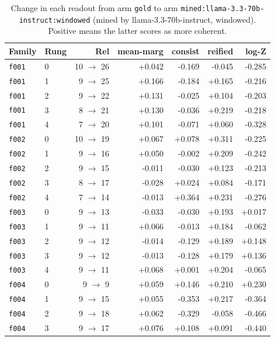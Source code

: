 \documentclass[11pt]{article}
\begin{document}
\begin{table}[htbp]
\centering
\small
\caption{Change in each readout from arm \texttt{gold} to arm \texttt{mined:llama-3.3-70b-instruct:windowed} (mined by llama-3.3-70b-instruct, windowed). Positive means the latter scores as more coherent.}
\label{tab:arm-delta-gold-mined-llama-3-3-70b-instruct-windowed}
\begin{tabular}{llrrrrr}
\toprule
Family & Rung & Rel & \textbf{mean-marg} & \textbf{consist} & \textbf{reified} & \textbf{log-Z} \\
\midrule
\texttt{f001} & 0 & 10 $\to$ 26 & +0.042 & -0.169 & -0.045 & -0.285 \\
\texttt{f001} & 1 & 9 $\to$ 25 & +0.166 & -0.184 & +0.165 & -0.216 \\
\texttt{f001} & 2 & 9 $\to$ 22 & +0.131 & -0.025 & +0.104 & -0.203 \\
\texttt{f001} & 3 & 8 $\to$ 21 & +0.130 & -0.036 & +0.219 & -0.218 \\
\texttt{f001} & 4 & 7 $\to$ 20 & +0.101 & -0.071 & +0.060 & -0.328 \\
\texttt{f002} & 0 & 10 $\to$ 19 & +0.067 & +0.078 & +0.311 & -0.225 \\
\texttt{f002} & 1 & 9 $\to$ 16 & +0.050 & -0.002 & +0.209 & -0.242 \\
\texttt{f002} & 2 & 9 $\to$ 15 & -0.011 & -0.030 & +0.123 & -0.213 \\
\texttt{f002} & 3 & 8 $\to$ 17 & -0.028 & +0.024 & +0.084 & -0.171 \\
\texttt{f002} & 4 & 7 $\to$ 14 & -0.013 & +0.364 & +0.231 & -0.276 \\
\texttt{f003} & 0 & 9 $\to$ 13 & -0.033 & -0.030 & +0.193 & +0.017 \\
\texttt{f003} & 1 & 9 $\to$ 11 & +0.066 & -0.013 & +0.184 & -0.062 \\
\texttt{f003} & 2 & 9 $\to$ 12 & -0.014 & -0.129 & +0.189 & +0.148 \\
\texttt{f003} & 3 & 9 $\to$ 12 & -0.013 & -0.128 & +0.179 & +0.136 \\
\texttt{f003} & 4 & 9 $\to$ 11 & +0.068 & +0.001 & +0.204 & -0.065 \\
\texttt{f004} & 0 & 9 $\to$ 9 & +0.059 & +0.146 & +0.210 & +0.230 \\
\texttt{f004} & 1 & 9 $\to$ 15 & +0.055 & -0.353 & +0.217 & -0.364 \\
\texttt{f004} & 2 & 9 $\to$ 18 & +0.062 & -0.329 & -0.058 & -0.466 \\
\texttt{f004} & 3 & 9 $\to$ 17 & +0.076 & +0.108 & +0.091 & -0.440 \\

\end{tabular}
\end{table}
\end{document}
